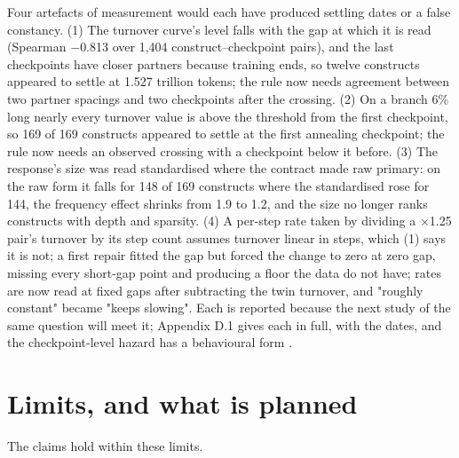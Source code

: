 \documentclass{article}
\begin{document}
Four artefacts of measurement would each have produced settling dates or a false constancy. (1) The turnover curve's level falls with the gap at which it is read (Spearman $-$0.813 over 1,404 construct--checkpoint pairs), and the last checkpoints have closer partners because training ends, so twelve constructs appeared to settle at 1.527 trillion tokens; the rule now needs agreement between two partner spacings and two checkpoints after the crossing. (2) On a branch 6\% long nearly every turnover value is above the threshold from the first checkpoint, so 169 of 169 constructs appeared to settle at the first annealing checkpoint; the rule now needs an observed crossing with a checkpoint below it before. (3) The response's size was read standardised where the contract made raw primary: on the raw form it falls for 148 of 169 constructs where the standardised rose for 144, the frequency effect shrinks from 1.9 to 1.2, and the size no longer ranks constructs with depth and sparsity. (4) A per-step rate taken by dividing a $\times$1.25 pair's turnover by its step count assumes turnover linear in steps, which (1) says it is not; a first repair fitted the gap but forced the change to zero at zero gap, missing every short-gap point and producing a floor the data do not have; rates are now read at fixed gaps after subtracting the twin turnover, and "roughly constant" became "keeps slowing". Each is reported because the next study of the same question will meet it; Appendix D.1 gives each in full, with the dates, and the checkpoint-level hazard has a behavioural form \citep{nishida2025}.

\section{Limits, and what is planned}

The claims hold within these limits.
\end{document}
